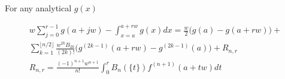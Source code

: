 \documentclass[a4paper]{article}
\begin{document}
\begin{theorem}
    For any analytical $g(x)$

    \begin{equation}
        \boxed{
            \begin{gathered}\label{dar:Euler-Maclaurin's formula}
                w \sum_{j=0}^{r-1} g(a+jw)  - \int_{x=a}^{a+rw} g(x) dx
                =
                \frac{w}{2} \Big( g(a) - g(a+rw) \Big)
                +
                \\
                \sum_{k=1}^{\lfloor n/2 \rfloor} \frac{w^{2k} B_{2k}}{(2k)!} \Big(g^{(2k-1)}(a+rw) - g^{(2k-1)}(a)\Big) + R_{n,r}
                \\
                R_{n,r} = \frac{(-1)^{n+1} w^{n+1}}{n!} \int_{0}^{r} B_n(\{t\}) f^{(n+1)}(a+tw) dt
            \end{gathered}
        }
    \end{equation}


\end{theorem}
\end{document}
